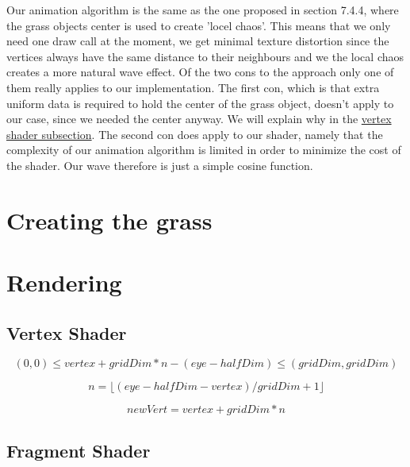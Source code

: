 Our animation algorithm is the same as the one proposed in section
7.4.4, where the grass objects center is used to create 'locel
chaos'. This means that we only need one draw call at the moment, we
get minimal texture distortion since the vertices always have the same
distance to their neighbours and we the local chaos creates a more
natural wave effect. Of the two cons to the approach only one of them
really applies to our implementation. The first con, which is that
extra uniform data is required to hold the center of the grass object,
doesn't apply to our case, since we needed the center anyway. We will
explain why in the \hyperref[sec:grassVert]{vertex shader
  subsection}. The second con does apply to our shader, namely that
the complexity of our animation algorithm is limited in order to
minimize the cost of the shader. Our wave therefore is just a simple
cosine function.

\section{Creating the grass}



\section{Rendering}


\subsection{Vertex Shader}\label{sec:grassVert}


\begin{displaymath}
  (0, 0) \le vertex + gridDim * n - (eye - halfDim) \le (gridDim, gridDim)
\end{displaymath}

\begin{displaymath}
  n = \lfloor (eye - halfDim - vertex) / gridDim + 1 \rfloor
\end{displaymath}

\begin{displaymath}
  newVert = vertex + gridDim * n
\end{displaymath}







\subsection{Fragment Shader}






